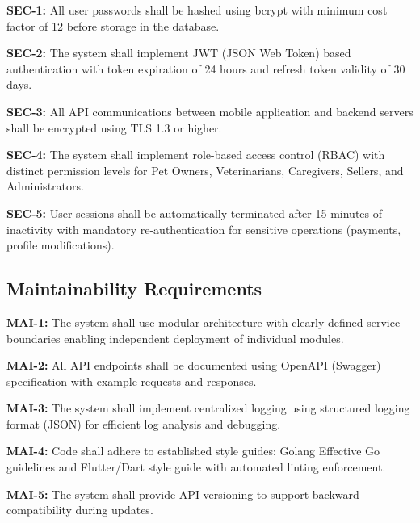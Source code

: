 \textbf{SEC-1:} All user passwords shall be hashed using bcrypt with minimum cost factor of 12 before storage in the database.

\textbf{SEC-2:} The system shall implement JWT (JSON Web Token) based authentication with token expiration of 24 hours and refresh token validity of 30 days.

\textbf{SEC-3:} All API communications between mobile application and backend servers shall be encrypted using TLS 1.3 or higher.


\textbf{SEC-4:} The system shall implement role-based access control (RBAC) with distinct permission levels for Pet Owners, Veterinarians, Caregivers, Sellers, and Administrators.

\textbf{SEC-5:} User sessions shall be automatically terminated after 15 minutes of inactivity with mandatory re-authentication for sensitive operations (payments, profile modifications).



\subsection{Maintainability Requirements}



\textbf{MAI-1:} The system shall use modular architecture with clearly defined service boundaries enabling independent deployment of individual modules.

\textbf{MAI-2:} All API endpoints shall be documented using OpenAPI (Swagger) specification with example requests and responses.

\textbf{MAI-3:} The system shall implement centralized logging using structured logging format (JSON) for efficient log analysis and debugging.

\textbf{MAI-4:} Code shall adhere to established style guides: Golang Effective Go guidelines and Flutter/Dart style guide with automated linting enforcement.

\textbf{MAI-5:} The system shall provide API versioning to support backward compatibility during updates.


